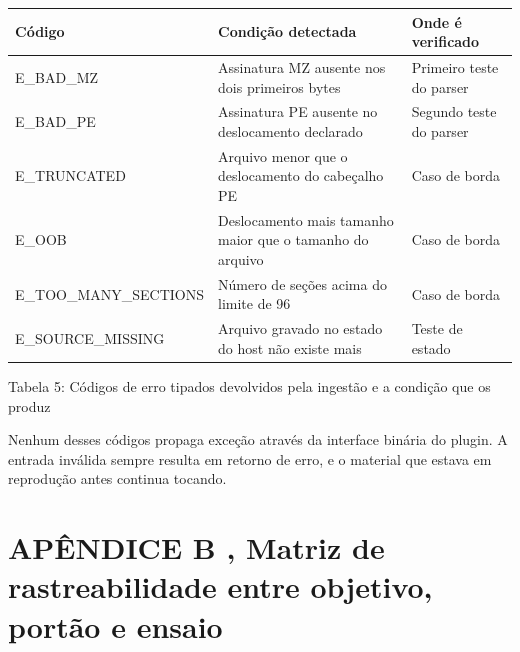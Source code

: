 \documentclass[12pt,a4paper]{article}
\begin{document}
\begin{center}
\footnotesize
\setlength{\tabcolsep}{4pt}
\begin{tabular}{p{}|p{}|p{}}
\hline
\textbf{Código} & \textbf{Condição detectada} & \textbf{Onde é verificado} \\
\hline
E\_BAD\_MZ & Assinatura MZ ausente nos dois primeiros bytes & Primeiro teste do parser \\
E\_BAD\_PE & Assinatura PE ausente no deslocamento declarado & Segundo teste do parser \\
E\_TRUNCATED & Arquivo menor que o deslocamento do cabeçalho PE & Caso de borda \\
E\_OOB & Deslocamento mais tamanho maior que o tamanho do arquivo & Caso de borda \\
E\_TOO\_MANY\_SECTIONS & Número de seções acima do limite de 96 & Caso de borda \\
E\_SOURCE\_MISSING & Arquivo gravado no estado do host não existe mais & Teste de estado \\
\hline
\end{tabular}
\end{center}
\noindent Tabela 5: Códigos de erro tipados devolvidos pela ingestão e a condição que os produz\par
\label{tab:5}
\vspace{2pt}{\footnotesize\noindent Elaborado pelos autores (2026).\par}

Nenhum desses códigos propaga exceção através da interface binária do plugin. A entrada inválida sempre resulta em retorno de erro, e o material que estava em reprodução antes continua tocando.


\section*{APÊNDICE B ,  Matriz de rastreabilidade entre objetivo, portão e ensaio}
\end{document}
